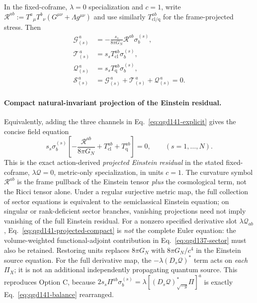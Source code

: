 \documentclass[11pt,a4paper]{article}
\begin{document}
In the fixed-coframe, $\lambda=0$ specialization and $c=1$,
write $\mathcal R^{ab}:=T^a{}_{\mu}T^b{}_{\nu}
(G^{\mu\nu}+\Lambda g^{\mu\nu})$ and use similarly
$T_{\mathrm{cl/q}}^{ab}$ for the frame-projected stress. Then
\begin{equation}\label{eq:qgd141-explicit}
\boxed{\begin{aligned}
\mathscr G_{(s)}^{\,a}&=-\frac{s_s}{8\pi G_N}
\mathcal R^{ab}\sigma_b^{(s)},\\
\mathscr T_{(s)}^{\,a}&=s_s T_{\mathrm{cl}}^{ab}\sigma_b^{(s)},\\
\mathscr Q_{(s)}^{\,a}&=s_s T_{\mathrm{q}}^{ab}\sigma_b^{(s)},\\
\mathscr S_{(s)}^{\,a}&=\mathscr G_{(s)}^{\,a}
+\mathscr T_{(s)}^{\,a}+\mathscr Q_{(s)}^{\,a}=0.
\end{aligned}}
\end{equation}
\paragraph{Compact natural-invariant projection of the Einstein residual.}
Equivalently, adding the three channels in
Eq.~\eqref{eq:qgd141-explicit} gives the concise field equation
\begin{equation}\label{eq:qgd141-projected-compact}
\boxed{\displaystyle
s_s\sigma_b^{(s)}\left[
-\frac{\mathcal R^{ab}}{8\pi G_N}
+T_{\mathrm{cl}}^{ab}+T_{\mathrm q}^{ab}\right]=0,
\qquad(s=1,\ldots,N).}
\end{equation}
This is the exact action-derived \emph{projected Einstein residual}
in the stated fixed-coframe, $\lambda\mathcal Q=0$, metric-only
specialization, in units $c=1$.  The curvature symbol
$\mathcal R^{ab}$ is the frame pullback of the Einstein tensor
\emph{plus} the cosmological term, not the Ricci tensor alone.
Under a regular surjective metric map, the full collection of sector
equations is equivalent to the semiclassical Einstein equation;
on singular or rank-deficient sector branches, vanishing projections
need not imply vanishing of the full Einstein residual.
For a nonzero specified derivative slot $\lambda\mathcal Q_{ab}$,
Eq.~\eqref{eq:qgd141-projected-compact} is \emph{not} the complete
Euler equation: the volume-weighted functional-adjoint contribution
in Eq.~\eqref{eq:qgd137-sector} must also be retained.
Restoring units replaces $8\pi G_N$ with $8\pi G_N/c^4$ in
the Einstein source equation. For the full derivative map, the
$-\lambda(D_s\mathcal Q)^*$ term acts on \emph{each} $\Pi_X$;
it is not an additional independently propagating quantum source.
This reproduces Option C, because
$2s_s\Pi^{ab}\sigma_b^{(s)}=
\lambda[(D_s\mathcal Q)^*_{\sqrt{-g}}\Pi]^a$ is exactly
Eq.~\eqref{eq:qgd141-balance} rearranged.
\end{document}
